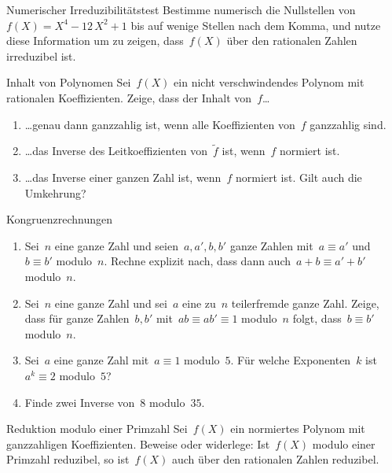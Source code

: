 \documentclass{algblatt}
\begin{document}
\vspace*{-1.5cm}

\begin{aufgabe}{Numerischer Irreduzibilitätstest}
Bestimme numerisch die Nullstellen von~$f(X) = X^4 - 12\,X^2 + 1$ bis auf
wenige Stellen nach dem Komma, und nutze diese Information um zu zeigen,
dass~$f(X)$ über den rationalen Zahlen irreduzibel ist.
\end{aufgabe}

\begin{aufgabe}{Inhalt von Polynomen}
Sei~$f(X)$ ein nicht verschwindendes Polynom mit rationalen Koeffizienten. Zeige, dass der
Inhalt von~$f$\ldots
\begin{enumerate}
\item \ldots genau dann ganzzahlig ist, wenn alle
Koeffizienten von~$f$ ganzzahlig sind.
\item \ldots das Inverse des Leitkoeffizienten
von~$\widetilde f$ ist, wenn~$f$ normiert ist.
\item \ldots das Inverse einer ganzen Zahl ist,
wenn~$f$ normiert ist. Gilt auch die Umkehrung?
\end{enumerate}
\end{aufgabe}

\begin{aufgabe}{Kongruenzrechnungen}
\begin{enumerate}
\item Sei~$n$ eine ganze Zahl und seien~$a,a', b,b'$ ganze Zahlen mit~$a \equiv
a'$ und~$b \equiv b'$ modulo~$n$. Rechne explizit nach, dass dann auch~$a+b
\equiv a'+b'$ modulo~$n$.
\item Sei~$n$ eine ganze Zahl und sei~$a$ eine zu~$n$ teilerfremde ganze Zahl.
Zeige, dass für ganze Zahlen~$b, b'$ mit~$a b \equiv a b' \equiv 1$ modulo~$n$
folgt, dass~$b \equiv b'$ modulo~$n$.
\item Sei~$a$ eine ganze Zahl mit~$a \equiv 1$ modulo~$5$. Für welche
Exponenten~$k$ ist~$a^k \equiv 2$ modulo~$5$?
\item Finde zwei Inverse von~$8$ modulo~$35$.
\end{enumerate}
\end{aufgabe}

\begin{aufgabe}{Reduktion modulo einer Primzahl}
Sei~$f(X)$ ein normiertes Polynom mit ganzzahligen Koeffizienten. Beweise oder
widerlege: Ist~$f(X)$ modulo einer Primzahl reduzibel, so ist~$f(X)$ auch über
den rationalen Zahlen reduzibel.
\end{aufgabe}
\end{document}
